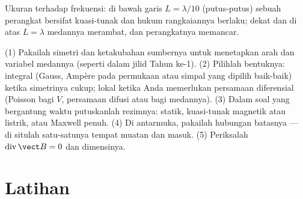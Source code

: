 \begin{omfigure}

{\small Ukuran terhadap frekuensi: di bawah garis $L = \lambda/10$ (putus-putus) sebuah
perangkat bersifat kuasi-tunak dan hukum rangkaiannya berlaku; dekat dan di atas
$L = \lambda$ medannya merambat, dan perangkatnya memancar.}
\end{omfigure}

\begin{method}\label{met:b2:maxwell-equations:method}
(1) Pakailah simetri dan ketakubahan sumbernya untuk menetapkan
arah dan variabel medannya (seperti dalam jilid Tahun ke-1).
(2) Pilihlah bentuknya: integral (Gauss, Ampère pada permukaan atau simpal
yang dipilih baik-baik) ketika simetrinya cukup; lokal ketika Anda memerlukan
persamaan diferensial (Poisson bagi $V$, persamaan difusi atau 
bagi medannya). (3) Dalam soal yang bergantung waktu putuskanlah rezimnya:
statik, kuasi-tunak magnetik atau listrik, atau Maxwell penuh. (4)
Di antarmuka, pakailah hubungan batasnya --- di situlah satu-satunya tempat
muatan dan  masuk. (5) Periksalah
$\operatorname{div}\vect B = 0$ dan dimensinya.
\end{method}

\section{Latihan}

